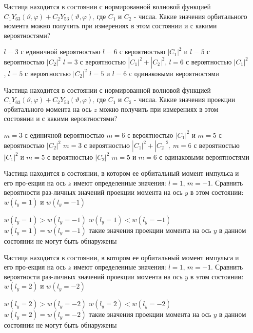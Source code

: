 \documentclass[11pt,a4paper]{exam}
\begin{document}
\begin{questions}
\question Частица находится в состоянии с нормированной волновой функцией ${C_1}{Y_{63}}(\vartheta ,\varphi ) + {C_2}{Y_{53}}(\vartheta ,\varphi )$, где ${C_1}$ и ${C_2}$ - числа. Какие значения орбитального момента можно получить при измерениях в этом состоянии и с какими вероятностями?
\begin{choices}
\choice $l = 3$ с единичной вероятностью
\choice $l = 6$ с вероятностью $|{C_1}{|^2}$ и $l = 5$ с вероятностью $|{C_2}{|^2}$
\choice $l = 3$ с вероятностью $|{C_1}{|^2} + |{C_2}{|^2}$, $l = 6$ с вероятностью $|{C_1}{|^2}$, $l = 5$ с вероятностью $|{C_2}{|^2}$
\choice $l = 5$ и $l = 6$ с одинаковыми вероятностями
\end{choices}

\question Частица находится в состоянии с нормированной волновой функцией ${C_1}{Y_{63}}(\vartheta ,\varphi ) + {C_2}{Y_{53}}(\vartheta ,\varphi )$, где ${C_1}$ и ${C_2}$ - числа. Какие значения проекции орбитального момента на ось $z$ можно получить при измерениях в этом состоянии и с какими вероятностями?
\begin{choices}
\choice $m = 3$ с единичной вероятностью
\choice $m = 6$ с вероятностью $|{C_1}{|^2}$ и $m = 5$ с вероятностью $|{C_2}{|^2}$
\choice $m = 3$ с вероятностью $|{C_1}{|^2} + |{C_2}{|^2}$, $m = 6$ с вероятностью $|{C_1}{|^2}$ и $m = 5$ с вероятностью $|{C_2}{|^2}$
\choice $m = 5$ и $m = 6$ с одинаковыми вероятностями
\end{choices}

\question Частица находится в состоянии, в котором ее орбитальный момент импульса и его про-екция на ось $z$ имеют определенные значения: $l = 1$, $m =  - 1$. Сравнить вероятности раз-личных значений проекции момента на ось $y$ в этом состоянии: $w({l_y} = 1)$ и $w({l_y} =  - 1)$
\begin{choices}
\choice $w({l_y} = 1) > w({l_y} =  - 1)$
\choice $w({l_y} = 1) < w({l_y} =  - 1)$
\choice $w({l_y} = 1) = w({l_y} =  - 1)$
\choice такие значения проекции момента на ось $y$ в данном состоянии не могут быть обнаружены
\end{choices}

\question Частица находится в состоянии, в котором ее орбитальный момент импульса и его про-екция на ось $z$ имеют определенные значения: $l = 1$, $m =  - 1$. Сравнить вероятности раз-личных значений проекции момента на ось $y$ в этом состоянии: $w({l_y} = 2)$ и $w({l_y} =  - 2)$
\begin{choices}
\choice $w({l_y} = 2) > w({l_y} =  - 2)$
\choice $w({l_y} = 2) < w({l_y} =  - 2)$
\choice $w({l_y} = 2) = w({l_y} =  - 2)$
\choice такие значения проекции момента на ось $y$ в данном состоянии не могут быть обнаружены
\end{choices}


\end{questions}
\end{document}
